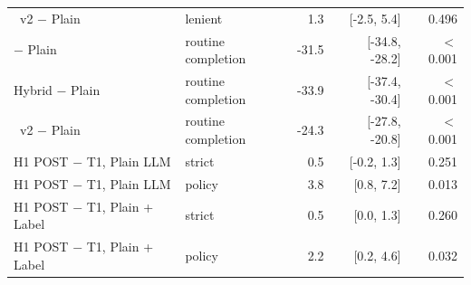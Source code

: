 \begin{tabular}{llrrr}
\recheck{}~v2 $-$ Plain & lenient & 1.3 & [-2.5, 5.4] & 0.496 \\
\recheck{} $-$ Plain & routine completion & -31.5 & [-34.8, -28.2] & $<$0.001 \\
Hybrid $-$ Plain & routine completion & -33.9 & [-37.4, -30.4] & $<$0.001 \\
\recheck{}~v2 $-$ Plain & routine completion & -24.3 & [-27.8, -20.8] & $<$0.001 \\
H1 POST $-$ T1, Plain LLM & strict & 0.5 & [-0.2, 1.3] & 0.251 \\
H1 POST $-$ T1, Plain LLM & policy & 3.8 & [0.8, 7.2] & 0.013 \\
H1 POST $-$ T1, Plain + Label & strict & 0.5 & [0.0, 1.3] & 0.260 \\
H1 POST $-$ T1, Plain + Label & policy & 2.2 & [0.2, 4.6] & 0.032 \\
\bottomrule\end{tabular}

